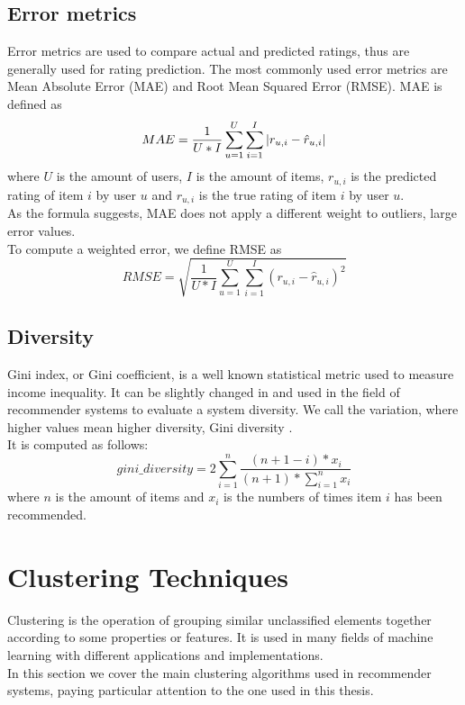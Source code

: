 \subsection{Error metrics}

Error metrics are used to compare actual and predicted ratings, thus are generally used for rating prediction. The most commonly used error metrics are Mean Absolute Error (MAE) and Root Mean Squared Error (RMSE).
MAE is defined as
\begin{equation*}
MAE = \frac{1}{U*I} \sum_{u=1}^{U} \sum_{i=1}^{I} \left\lvert r_{u,i} - \hat{r}_{u,i}\right\rvert
\end{equation*}
where $U$ is the amount of users, $I$ is the amount of items, $r_{u,i}$ is the predicted rating of item $i$ by user $u$ and $r_{u,i}$ is the true rating of item $i$ by user $u$.\\
As the formula suggests, MAE does not apply a different weight to outliers, large error values.\\
To compute a weighted error, we define RMSE as
\begin{equation*}
RMSE = \sqrt{\frac{1}{U*I} \sum_{u=1}^{U} \sum_{i=1}^{I} (r_{u,i} - \hat{r}_{u,i})^2}
\end{equation*}


\subsection{Diversity}

Gini index, or Gini coefficient, is a well known statistical metric used to measure income inequality. It can be slightly changed in and used in the field of recommender systems to evaluate a system diversity. We call the variation, where higher values mean higher diversity, Gini diversity \cite{Diversity}.\\
It is computed as follows:
\begin{equation*}
gini\_diversity = 2 \sum_{i=1}^{n} \frac{(n + 1 - i) * x_i}{(n + 1) * \sum_{i=1}^{n} x_i}
\end{equation*}
where $n$ is the amount of items and $x_i$ is the numbers of times item $i$ has been recommended.



\section{Clustering Techniques}

Clustering is the operation of grouping similar unclassified elements together according to some properties or features. It is used in many fields of machine learning with different applications and implementations.\\
In this section we cover the main clustering algorithms used in recommender systems, paying particular attention to the one used in this thesis.


